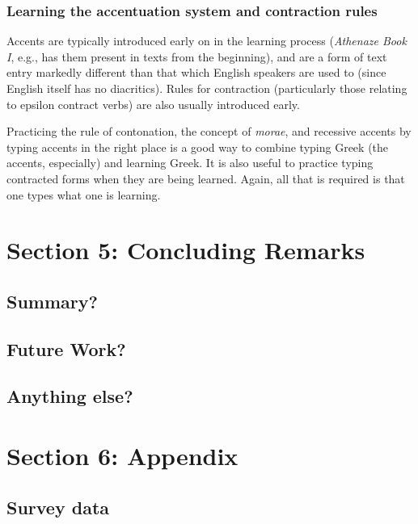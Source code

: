 \documentclass[11pt]{article}
\begin{document}
\subsubsection{Learning the accentuation system and contraction rules}
\label{sec:org22d68e4}

Accents are typically introduced early on in the learning process (\emph{Athenaze Book I}, e.g., has them present in texts from the beginning), and are a form of text entry markedly different than that which English speakers are used to (since English itself has no diacritics). Rules for contraction (particularly those relating to epsilon contract verbs) are also usually introduced early.

Practicing the rule of contonation, the concept of \emph{morae}, and recessive accents by typing accents in the right place is a good way to combine typing Greek (the accents, especially) and learning Greek. It is also useful to practice typing contracted forms when they are being learned. Again, all that is required is that one types what one is learning.

\section{Section 5: Concluding Remarks}
\label{sec:org520a39d}

\subsection{Summary?}
\label{sec:org718c6d0}

\subsection{Future Work?}
\label{sec:org25adb64}

\subsection{Anything else?}
\label{sec:org1097e83}

\section{Section 6: Appendix}
\label{sec:orga540b5e}

\subsection{Survey data}
\label{sec:org2a6a2a5}
\end{document}
